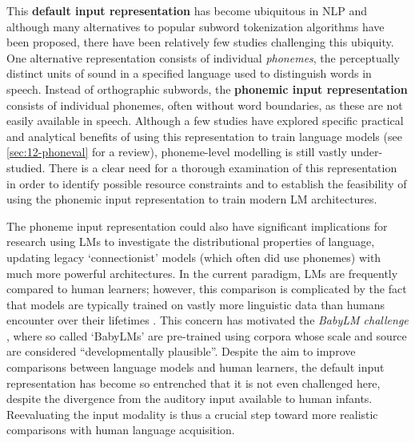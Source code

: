 This \textbf{default input representation} has become ubiquitous in NLP and although many alternatives to popular subword tokenization algorithms have been proposed, there have been relatively few studies challenging this ubiquity. One alternative representation consists of individual \emph{phonemes}, the perceptually distinct units of sound in a specified language used to distinguish words in speech. Instead of orthographic subwords, the \textbf{phonemic input representation} consists of individual phonemes, often without word boundaries, as these are not easily available in speech. Although a few studies have explored specific practical and analytical benefits of using this representation to train language models (see \cref{sec:12-phoneval} for a review), phoneme-level modelling is still vastly under-studied. There is a clear need for a thorough examination of this representation in order to identify possible resource constraints %
and to establish the feasibility of using the phonemic input representation to train modern LM architectures.%


The phoneme input representation could also have significant implications for research using LMs to investigate the distributional properties of language, updating legacy `connectionist' models (which often did use phonemes) with much more powerful architectures. In the current paradigm, LMs are frequently compared to human learners; however, this comparison is complicated by the fact that models are typically trained on vastly more linguistic data than humans encounter over their lifetimes \citep{huebner-etal-2021-babyberta}. This concern has motivated the \emph{BabyLM challenge} \citep{warstadt-2023-babylm-findings,conll-2024-babylm}, where so called `BabyLMs' are pre-trained using corpora whose scale and source are considered ``developmentally plausible''. Despite the aim to improve comparisons between language models and human learners, the default input representation has become so entrenched that it is not even challenged here, despite the divergence from the auditory input available to human infants. Reevaluating the input modality is thus a crucial step toward more realistic comparisons with human language acquisition.

